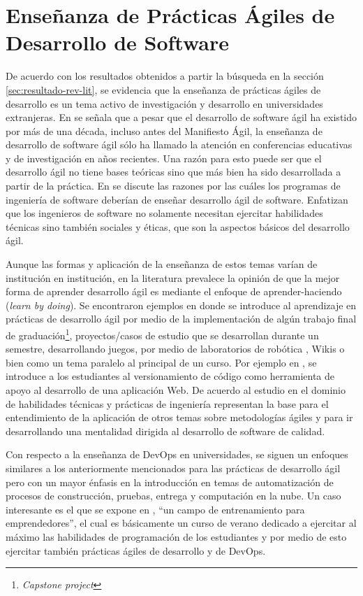 \section{Enseñanza de Prácticas Ágiles de Desarrollo de Software} \label{sec:ensenanza}
De acuerdo con los resultados obtenidos a partir la búsqueda en la sección \ref{sec:resultado-rev-lit}, se evidencia que la enseñanza de prácticas ágiles de desarrollo es un tema activo de investigación y desarrollo en universidades extranjeras. En \cite{kropp-meier-1} se señala que a pesar que el desarrollo de software ágil ha existido por más de una década, incluso antes del Manifiesto Ágil, la enseñanza de desarrollo de software ágil sólo ha llamado la atención en conferencias educativas y de investigación en años recientes. Una razón para esto puede ser que el desarrollo ágil no tiene bases teóricas sino que más bien ha sido desarrollada a partir de la práctica. En \cite{hazzan-dubinsky} se discute las razones por las cuáles los programas de ingeniería de software deberían de enseñar desarrollo ágil de software. Enfatizan que los ingenieros de software no solamente necesitan ejercitar habilidades técnicas sino también sociales y éticas, que son la aspectos básicos del desarrollo ágil.


Aunque las formas y aplicación de la enseñanza de estos temas varían de institución en institución, en la literatura prevalece la opinión de que la mejor forma de aprender desarrollo ágil es mediante el enfoque de aprender-haciendo (\emph{learn by doing}). Se encontraron ejemplos en donde se introduce al aprendizaje en prácticas de desarrollo ágil por medio de la implementación de algún trabajo final de graduación\footnote{\emph{Capstone project}}\cite{ding-yousef-yue}, proyectos/casos de estudio que se desarrollan durante un semestre\cite{steghoger-et-al}, desarrollando juegos\cite{scharlau}, por medio de laboratorios de robótica \cite{schroeder-et-al}, Wikis \cite{cubric} o bien como un tema paralelo al principal de un curso. Por ejemplo en \cite{haaranen-lehtinen}, se introduce a los estudiantes al versionamiento de código como herramienta de apoyo al desarrollo de una aplicación Web. De acuerdo al estudio en \cite{kropp-meier-2} el dominio de habilidades técnicas y prácticas de ingeniería representan la base para el entendimiento de la aplicación de otros temas sobre metodologías ágiles y para ir desarrollando una mentalidad dirigida al desarrollo de software de calidad.

Con respecto a la enseñanza de DevOps en universidades, se siguen un enfoques similares a los anteriormente mencionados para las prácticas de desarrollo ágil pero con un mayor énfasis en la introducción en temas de automatización \cite{henrik-b, bang-et-al, betz-et-al} de procesos de construcción, pruebas, entrega y computación en la nube. Un caso interesante es el que se expone en \cite{hickey-salas}, ``un campo de entrenamiento para emprendedores'', el cual es básicamente un curso de verano dedicado a ejercitar al máximo las habilidades de programación de los estudiantes y por medio de esto ejercitar también prácticas ágiles de desarrollo y de DevOps.





